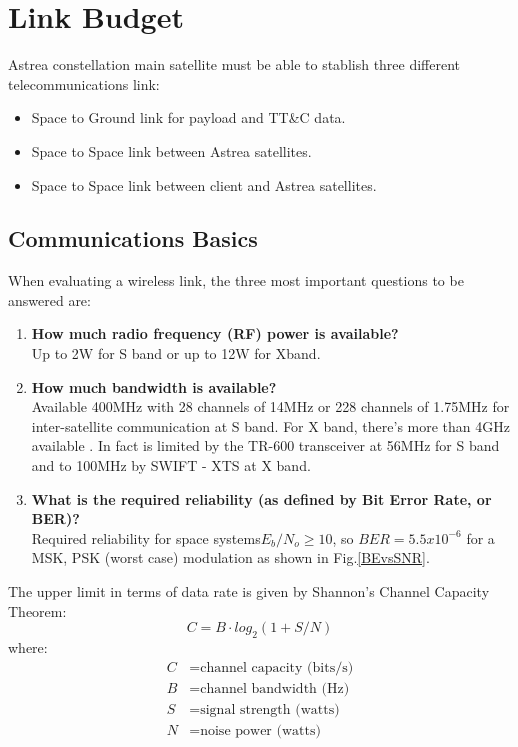 \section{Link Budget}

Astrea constellation main satellite must be able to stablish three different telecommunications link: 
\begin{itemize}
\item Space to Ground link for payload and TT\&C data.
\item Space to Space link between Astrea satellites.
\item Space to Space link between client and Astrea satellites.
\end{itemize} 

\subsection{Communications Basics}
When evaluating a wireless link, the three most important questions to be answered are: \cite{Note1998}\\

\begin{enumerate}
\item \textbf{How much radio frequency (RF) power is available?}\\
Up to 2W for S band or up to 12W for Xband.
\item \textbf{How much bandwidth is available?}\\
Available 400MHz with 28 channels of 14MHz or 228 channels of 1.75MHz for inter-satellite communication at S band. For X band, there's more than 4GHz available \cite{SecretariadeEstadodetelecomunicacionesyparalasociedaddelainformacion.2015}. In fact is limited by the TR-600 transceiver at 56MHz for S band and to 100MHz by SWIFT - XTS at X band.
\item \textbf{What is the required reliability (as defined by Bit Error Rate, or BER)?}\\	
Required reliability for space systems$E_b/N_o \geq 10$, so $BER=5.5x10^{-6}$ for a MSK, PSK (worst case) modulation as shown in Fig.\ref{BEvsSNR}.
\end{enumerate}

The upper limit in terms of data rate is given by Shannon's Channel Capacity Theorem:
\begin{equation}
	C=B\cdot log_2(1+S/N)
	\label{channelCapacity}
\end{equation}
where:
\begin{align*}
	C&= \text{channel capacity (bits/s)}\\
	B&= \text{channel bandwidth (Hz)}\\
	S&= \text{signal strength (watts)}\\
	N&= \text{noise power (watts)}
\end{align*}

